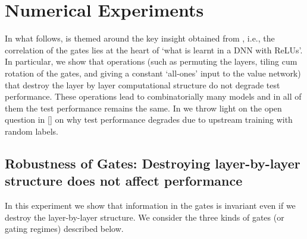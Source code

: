 \section{Numerical Experiments}\label{sec:exp} 
In what follows,  is themed around the key insight obtained from , i.e., the correlation of the gates lies at the heart of `what is learnt in a DNN with ReLUs'. In particular, we show that operations (such as permuting the layers, tiling cum rotation of the gates, and giving a constant `all-ones' input to the value network) that destroy the layer by layer computational structure do not degrade test performance. These operations lead to combinatorially many models and in all of them the test performance remains the same. In  we throw light on the open question in [] on why test performance degrades due to upstream training with random labels. 
\subsection{Robustness of Gates: Destroying layer-by-layer structure does not affect performance}\label{sec:exp1}
In this experiment we show that information in the gates is invariant even if we destroy the layer-by-layer structure. We consider the three kinds of gates (or gating regimes) described below.\\

